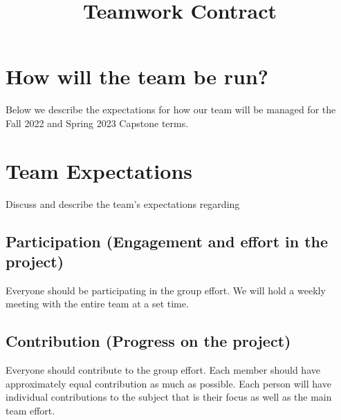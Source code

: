 \documentclass[conference]{IEEEtran}
\begin{document}
\newtheorem{theorem}{Theorem}
\newtheorem{assumption}{Assumption}
\newtheorem{proposition}{Proposition}
\newtheorem{algorithm}{Algorithm}
\newtheorem{lemma}{Lemma}
\newtheorem{definition}{Definition}

\title{Teamwork Contract}

\author{
}

\IEEEoverridecommandlockouts
\maketitle
\IEEEpubidadjcol



\section{How will the team be run?}
Below we describe the expectations for how our team will be managed for the Fall 2022 and Spring 2023 Capstone terms. 
\section{Team Expectations}
Discuss and describe the team’s expectations regarding

\subsection{Participation (Engagement and effort in the project)}
Everyone should be participating in the group effort. We will hold a weekly meeting with the entire team at a set time. 
\subsection{Contribution (Progress on the project)}
Everyone should contribute to the group effort. Each member should have approximately equal contribution as much as possible. Each person will have individual contributions to the subject that is their focus as well as the main team effort.
\end{document}
